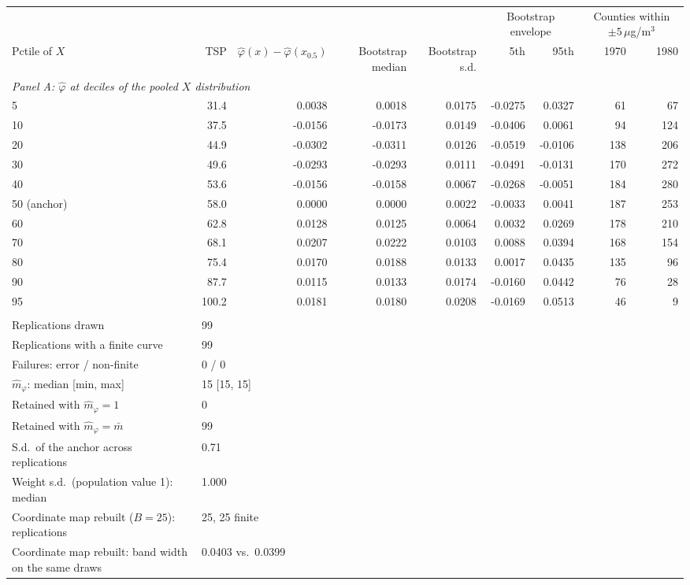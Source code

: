 \begin{tabular}{lrrrrrrrr}
\toprule
& & & & & \multicolumn{2}{c}{Bootstrap envelope} & \multicolumn{2}{c}{Counties within $\pm5\,\mu$g/m$^3$} \\
\cmidrule(lr){6-7} \cmidrule(lr){8-9}
Pctile of $X$ & TSP & $\hat\varphi(x)-\hat\varphi(x_{0.5})$ & Bootstrap median & Bootstrap s.d. & 5th & 95th & 1970 & 1980 \\
\midrule
\multicolumn{9}{l}{\textit{Panel A: $\hat\varphi$ at deciles of the pooled $X$ distribution}} \\
\midrule
5 & 31.4 & 0.0038 & 0.0018 & 0.0175 & -0.0275 & 0.0327 & 61 & 67 \\
10 & 37.5 & -0.0156 & -0.0173 & 0.0149 & -0.0406 & 0.0061 & 94 & 124 \\
20 & 44.9 & -0.0302 & -0.0311 & 0.0126 & -0.0519 & -0.0106 & 138 & 206 \\
30 & 49.6 & -0.0293 & -0.0293 & 0.0111 & -0.0491 & -0.0131 & 170 & 272 \\
40 & 53.6 & -0.0156 & -0.0158 & 0.0067 & -0.0268 & -0.0051 & 184 & 280 \\
50 (anchor) & 58.0 & 0.0000 & 0.0000 & 0.0022 & -0.0033 & 0.0041 & 187 & 253 \\
60 & 62.8 & 0.0128 & 0.0125 & 0.0064 & 0.0032 & 0.0269 & 178 & 210 \\
70 & 68.1 & 0.0207 & 0.0222 & 0.0103 & 0.0088 & 0.0394 & 168 & 154 \\
80 & 75.4 & 0.0170 & 0.0188 & 0.0133 & 0.0017 & 0.0435 & 135 & 96 \\
90 & 87.7 & 0.0115 & 0.0133 & 0.0174 & -0.0160 & 0.0442 & 76 & 28 \\
95 & 100.2 & 0.0181 & 0.0180 & 0.0208 & -0.0169 & 0.0513 & 46 & 9 \\
\addlinespace
\multicolumn{9}{l}{\textit{Panel B: multiplier design and convergence}} \\
\midrule
Replications drawn & \multicolumn{8}{l}{99} \\
Replications with a finite curve & \multicolumn{8}{l}{99} \\
Failures: error / non-finite & \multicolumn{8}{l}{0 / 0} \\
$\hat m_\varphi$: median [min, max] & \multicolumn{8}{l}{15 [15, 15]} \\
Retained with $\hat m_\varphi = 1$ & \multicolumn{8}{l}{0} \\
Retained with $\hat m_\varphi = \bar m$ & \multicolumn{8}{l}{99} \\
S.d.\ of the anchor across replications & \multicolumn{8}{l}{0.71} \\
Weight s.d.\ (population value 1): median & \multicolumn{8}{l}{1.000} \\
\addlinespace
Coordinate map rebuilt ($B=25$): replications & \multicolumn{8}{l}{25, 25 finite} \\
Coordinate map rebuilt: band width on the same draws & \multicolumn{8}{l}{0.0403 vs.\ 0.0399} \\
\bottomrule
\end{tabular}
